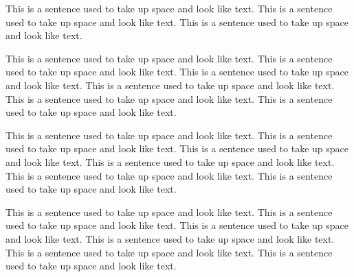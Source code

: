  
 
This is a sentence used to take up space and look like text.
This is a sentence used to take up space and look like text.
This is a sentence used to take up space and look like text.
 
This is a sentence used to take up space and look like text.
This is a sentence used to take up space and look like text.
This is a sentence used to take up space and look like text.
This is a sentence used to take up space and look like text.
This is a sentence used to take up space and look like text.
This is a sentence used to take up space and look like text.
 
This is a sentence used to take up space and look like text.
This is a sentence used to take up space and look like text.
This is a sentence used to take up space and look like text.
This is a sentence used to take up space and look like text.
This is a sentence used to take up space and look like text.
This is a sentence used to take up space and look like text.
 
This is a sentence used to take up space and look like text.
This is a sentence used to take up space and look like text.
This is a sentence used to take up space and look like text.
This is a sentence used to take up space and look like text.
This is a sentence used to take up space and look like text.
This is a sentence used to take up space and look like text.
